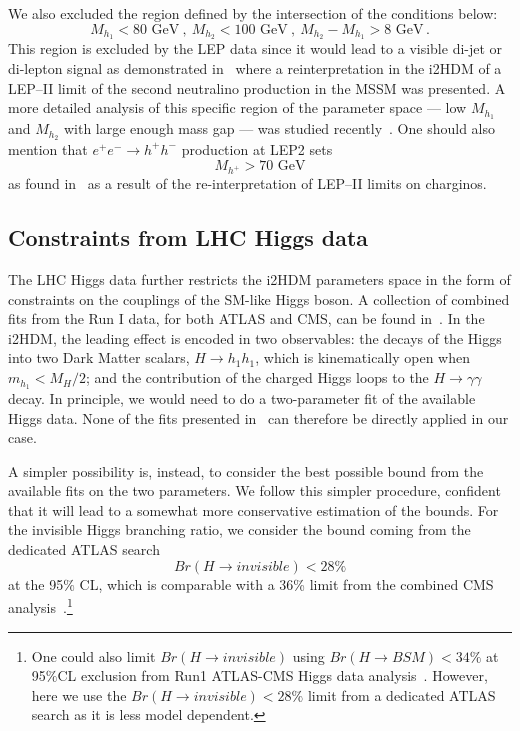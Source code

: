 \documentclass[12pt,a4paper]{article}
\begin{document}
We also excluded the region defined by the intersection of the conditions below:
\begin{equation}
M_{h_1}<80\mbox{ GeV} \ , \ M_{h_2}<100\mbox{ GeV} \ ,  \ M_{h_2}-M_{h_1}>8 \mbox{ GeV}\,.
\label{eq:dmh12}
\end{equation}
This region is excluded by the LEP data since it would lead to a visible
di-jet or di-lepton signal as demonstrated in~\cite{Lundstrom:2008ai}
where a reinterpretation in the i2HDM of a LEP--II limit of the second neutralino production in the MSSM was presented.
A more detailed analysis of this specific region of the parameter space ---
low $M_{h_1}$ and $M_{h_2}$ with large enough mass gap --- was studied recently~\cite{Belanger:2015kga}.
One should also mention that  $e^+e^-\to h^+h^-$ production at LEP2
sets
\begin{equation}
M_{h^+}>70\mbox{ GeV}
\label{eq:mhcp-lep2}
\end{equation}
as found in~\cite{Pierce:2007ut} as a result of the re-interpretation of LEP--II limits on charginos.



%
\subsection{Constraints from LHC Higgs data}

The LHC Higgs data further restricts the i2HDM parameters space in the form of constraints on the couplings of the SM-like Higgs boson. A collection of combined fits from the Run I data, for both ATLAS and CMS, can be found in~\cite{Khachatryan:2016vau}.
In the i2HDM, the leading effect is encoded in two observables: the decays of the Higgs into two Dark Matter scalars, $H \to h_1 h_1$, which is kinematically open when $m_{h_1} < M_H/2$; and the contribution of the charged Higgs loops to the $H \to \gamma \gamma$ decay. 
In principle, we would need to do a two-parameter fit of the available Higgs data.  None of the fits presented in~\cite{Khachatryan:2016vau} can therefore be directly applied in our case.

A simpler possibility is, instead, to consider the best possible bound from the available fits on the two parameters.
We follow this simpler procedure, confident that it will lead to a somewhat more conservative estimation of the bounds.
For the invisible Higgs branching ratio, we consider the bound coming from the dedicated ATLAS search~\cite{Aad:2015txa}
\begin{equation}
Br(H\to invisible)  < 28\% 
\label{eq:lhc-higgs-invis}
\end{equation}
at the 95$\%$ CL, which is comparable with a 36\% limit
from the combined CMS analysis~\cite{CMS:2015naa}.\footnote{One could also limit $Br(H\to invisible)$ 
using $Br(H\to BSM)<34\% $ at 95$\%$CL exclusion from Run1  ATLAS-CMS Higgs data analysis~\cite{Khachatryan:2016vau}.
However, here we use the $Br(H\to invisible) < 28\% $ limit from a dedicated ATLAS search
as it is less model dependent.}
\end{document}
